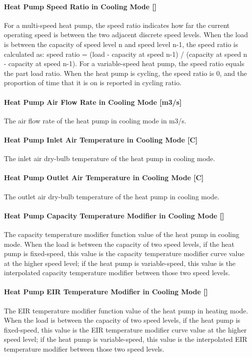 \paragraph{Heat Pump Speed Ratio in Cooling Mode {[}{]}} For a multi-speed heat pump, the speed ratio
indicates how far the current operating speed is between the two adjacent discrete speed levels.
When the load is between the capacity of speed level n and speed level n-1, the speed ratio is calculated as:
speed ratio = (load - capacity at speed n-1) / (capacity at speed n - capacity at speed n-1).
For a variable-speed heat pump, the speed ratio equals the part load ratio.
When the heat pump is cycling, the speed ratio is 0, and the proportion of time that it is on is reported in cycling ratio.
\paragraph{Heat Pump Air Flow Rate in Cooling Mode {[}m3/s{]}}
The air flow rate of the heat pump in cooling mode in m3/s.
\paragraph{Heat Pump Inlet Air Temperature in Cooling Mode {[}C{]}}
The inlet air dry-bulb temperature of the heat pump in cooling mode.
\paragraph{Heat Pump Outlet Air Temperature in Cooling Mode {[}C{]}}
The outlet air dry-bulb temperature of the heat pump in cooling mode.
\paragraph{Heat Pump Capacity Temperature Modifier in Cooling Mode {[}{]}}
The capacity temperature modifier function value of the heat pump in cooling
mode. When the load is between the capacity of two speed levels, if the heat
pump is fixed-speed, this value is the capacity temperature modifier curve value
at the higher speed level; if the heat pump is variable-speed, this value is the
interpolated capacity temperature modifier between those two speed levels.
\paragraph{Heat Pump EIR Temperature Modifier in Cooling Mode {[}{]}}
The EIR temperature modifier function value of the heat pump in heating
mode. When the load is between the capacity of two speed levels, if the heat
pump is fixed-speed, this value is the EIR temperature modifier curve value
at the higher speed level; if the heat pump is variable-speed, this value is the
interpolated EIR temperature modifier between those two speed levels.
